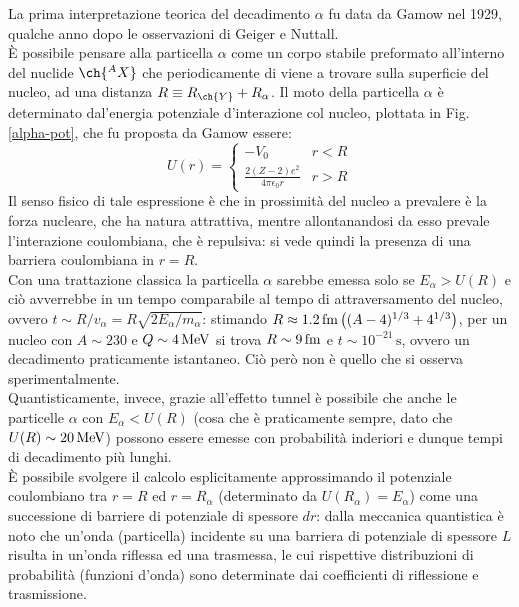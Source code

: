La prima interpretazione teorica del decadimento $ \alpha $ fu data da Gamow nel 1929, qualche anno dopo le osservazioni di Geiger e Nuttall.\\
È possibile pensare alla particella $ \alpha $ come un corpo stabile preformato all'interno del nuclide $ \ch{^A X} $ che periodicamente di viene a trovare sulla superficie del nucleo, ad una distanza $ R \equiv R_{\ch{Y}} + R_{\alpha} $. Il moto della particella $ \alpha $ è determinato dal'energia potenziale d'interazione col nucleo, plottata in Fig. \ref{alpha-pot}, che fu proposta da Gamow essere:
\begin{equation}
	U(r) =
	\begin{cases}
		-V_0 & r < R \\
		\frac{2(Z-2)e^2}{4\pi \epsilon_0 r} & r > R
	\end{cases}
	\label{eq:2.12}
\end{equation}
Il senso fisico di tale espressione è che in prossimità del nucleo a prevalere è la forza nucleare, che ha natura attrattiva, mentre allontanandosi da esso prevale l'interazione coulombiana, che è repulsiva: si vede quindi la presenza di una barriera coulombiana in $ r = R $.\\
Con una trattazione classica la particella $ \alpha $ sarebbe emessa solo se $ E_{\alpha} > U(R) $ e ciò avverrebbe in un tempo comparabile al tempo di attraversamento del nucleo, ovvero $ t \sim R / v_{\alpha} = R \sqrt{2E_{\alpha} / m_{\alpha}} $: stimando $ R \approx 1.2\,\mathrm{fm} \left( (A - 4)^{1/3} + 4^{1/3} \right) $, per un nucleo con $ A \sim 230 $ e $ Q \sim 4\,\mathrm{MeV} $ si trova $ R \sim 9\,\mathrm{fm} $ e $ t \sim 10^{-21}\,\text{s} $, ovvero un decadimento praticamente istantaneo. Ciò però non è quello che si osserva sperimentalmente.\\
Quantisticamente, invece, grazie all'effetto tunnel è possibile che anche le particelle $ \alpha $ con $ E_{\alpha} < U(R) $ (cosa che è praticamente sempre, dato che $ U(R) \sim 20\,\mathrm{MeV} $) possono essere emesse con probabilità inderiori e dunque tempi di decadimento più lunghi.\\
È possibile svolgere il calcolo esplicitamente approssimando il potenziale coulombiano tra $ r = R $ ed $ r = R_{\alpha} $ (determinato da $ U(R_{\alpha}) = E_{\alpha} $) come una successione di barriere di potenziale di spessore $ dr $: dalla meccanica quantistica è noto che un'onda (particella) incidente su una barriera di potenziale di spessore $ L $ risulta in un'onda riflessa ed una trasmessa, le cui rispettive distribuzioni di probabilità (funzioni d'onda) sono determinate dai coefficienti di riflessione e trasmissione.

